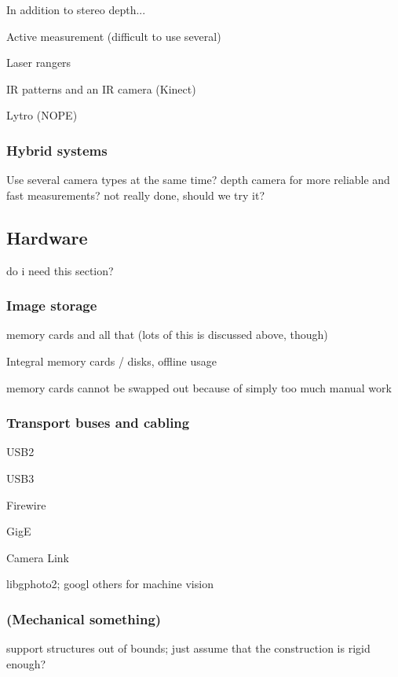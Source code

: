 In addition to stereo depth...

Active measurement (difficult to use several)

Laser rangers

IR patterns and an IR camera (Kinect)

Lytro (NOPE)

\subsubsection{Hybrid systems}

Use several camera types at the same time? depth camera for more reliable and fast measurements? not really done, should we try it?


\subsection{Hardware} %

do i need this section?

\subsubsection{Image storage}

memory cards and all that (lots of this is discussed above, though)

Integral memory cards / disks, offline usage

memory cards cannot be swapped out because of simply too much manual work

\subsubsection{Transport buses and cabling}

USB2

USB3

Firewire

GigE

Camera Link

libgphoto2; googl others for machine vision

\subsubsection{(Mechanical something)}

support structures out of bounds; just assume that the construction is rigid enough?


